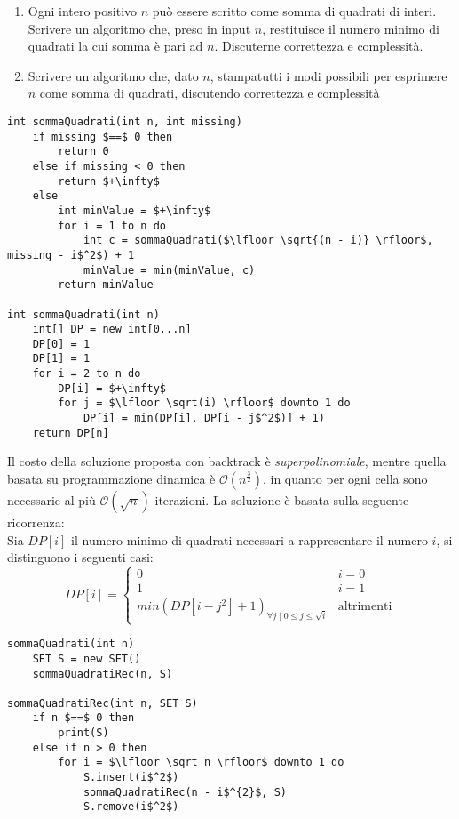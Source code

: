 \documentclass[../cheatSheetAlgoritmi.tex]{subfiles}
\begin{document}
\begin{enumerate}
	\item Ogni intero positivo $n$ può essere scritto come somma di quadrati di interi. Scrivere un algoritmo che, preso in input $n$, restituisce il numero minimo di quadrati la cui somma è pari ad $n$. Discuterne correttezza e complessità.
	\item Scrivere un algoritmo che, dato $n$, stampatutti i modi possibili per esprimere $n$ come somma di quadrati, discutendo correttezza e complessità
\end{enumerate}
\begin{lstlisting}[caption=Somma di Quadrati - Conteggio]
int sommaQuadrati(int n, int missing)
    if missing $==$ 0 then
        return 0
    else if missing < 0 then
        return $+\infty$
    else
        int minValue = $+\infty$
        for i = 1 to n do 
            int c = sommaQuadrati($\lfloor \sqrt{(n - i)} \rfloor$, missing - i$^2$) + 1
            minValue = min(minValue, c)
        return minValue

int sommaQuadrati(int n)
    int[] DP = new int[0...n]
    DP[0] = 1
    DP[1] = 1
    for i = 2 to n do
        DP[i] = $+\infty$
        for j = $\lfloor \sqrt(i) \rfloor$ downto 1 do
            DP[i] = min(DP[i], DP[i - j$^2$)] + 1)
    return DP[n]
\end{lstlisting}
Il costo della soluzione proposta con backtrack è \emph{superpolinomiale}, mentre quella basata su programmazione dinamica è $\mathcal{O}(n^\frac{3}{2})$, in quanto per ogni cella sono necessarie al più $\mathcal{O}(\sqrt n)$ iterazioni. La soluzione è basata sulla seguente ricorrenza: \\
Sia $DP[i]$ il numero minimo di quadrati necessari a rappresentare il numero $i$, si distinguono i seguenti casi:
\begin{equation*}
    DP[i]=\begin{cases}
        0 & \text{$i = 0$}\\
        1 & \text{$i = 1$}\\
        min(DP[i - j^2] + 1)_{\forall j \mid 0 \leq j \leq \sqrt i} & \text{altrimenti} 
    \end{cases}
\end{equation*}
\begin{lstlisting}[caption= Somma di Quadrati - Elenco Insiemi]
sommaQuadrati(int n)
	SET S = new SET()
	sommaQuadratiRec(n, S)
	
sommaQuadratiRec(int n, SET S)
	if n $==$ 0 then
		print(S)
	else if n > 0 then
		for i = $\lfloor \sqrt n \rfloor$ downto 1 do
			S.insert(i$^2$)
			sommaQuadratiRec(n - i$^{2}$, S)
			S.remove(i$^2$)	
\end{lstlisting}
\end{document}
